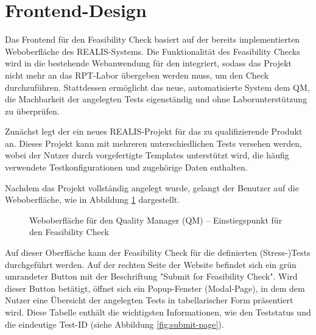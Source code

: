 \section{Frontend-Design}
Das Frontend für den Feasibility Check basiert auf der bereits implementierten Weboberfläche des \gls{REALIS}-Systems. Die Funktionalität des Feasibility Checks wird in die bestehende Webanwendung für den  integriert, sodass das Projekt nicht mehr an das \gls{RPT}-Labor übergeben werden muss, um den Check durchzuführen. Stattdessen ermöglicht das neue, automatisierte System dem \gls{QM}, die Machbarkeit der angelegten Tests eigenständig und ohne Laborunterstützung zu überprüfen.

Zunächst legt der  ein neues \gls{REALIS}-Projekt für das zu qualifizierende Produkt an. Dieses Projekt kann mit mehreren unterschiedlichen Tests versehen werden, wobei der Nutzer durch vorgefertigte Templates unterstützt wird, die häufig verwendete Testkonfigurationen und zugehörige Daten enthalten.

Nachdem das Projekt vollständig angelegt wurde, gelangt der Benutzer auf die Weboberfläche, wie in Abbildung \ref{fig:whole-page} dargestellt.

\begin{figure}[!htbp] 
    \centering 
    \caption{Weboberfläche für den Quality Manager (QM) – Einstiegspunkt für den Feasibility Check} 
    \label{fig:whole-page} 
\end{figure}

Auf dieser Oberfläche kann der Feasibility Check für die definierten (Stress-)Tests durchgeführt werden. Auf der rechten Seite der Website befindet sich ein grün umrandeter Button mit der Beschriftung "Submit for Feasibility Check". Wird dieser Button betätigt, öffnet sich ein Popup-Fenster (Modal-Page), in dem dem Nutzer eine Übersicht der angelegten Tests in tabellarischer Form präsentiert wird. Diese Tabelle enthält die wichtigsten Informationen, wie den Teststatus und die eindeutige Test-ID (siehe Abbildung \ref{fig:submit-page}).

